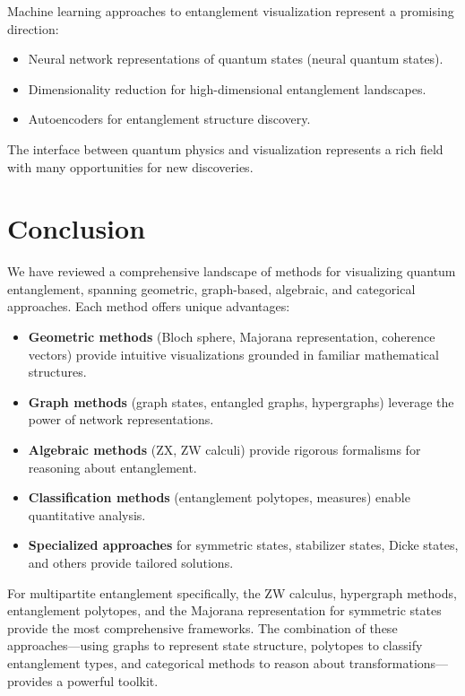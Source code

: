 \documentclass[12pt,a4paper]{article}
\begin{document}
Machine learning approaches to entanglement visualization represent a promising direction:
\begin{itemize}
	\item Neural network representations of quantum states (neural quantum states).
	\item Dimensionality reduction for high-dimensional entanglement landscapes.
	\item Autoencoders for entanglement structure discovery.
\end{itemize}

The interface between quantum physics and visualization represents a rich field with many opportunities for new discoveries.

\section{Conclusion}
\label{sec:conclusion}

We have reviewed a comprehensive landscape of methods for visualizing quantum entanglement, spanning geometric, graph-based, algebraic, and categorical approaches. Each method offers unique advantages:

\begin{itemize}
	\item \textbf{Geometric methods} (Bloch sphere, Majorana representation, coherence vectors) provide intuitive visualizations grounded in familiar mathematical structures.
	\item \textbf{Graph methods} (graph states, entangled graphs, hypergraphs) leverage the power of network representations.
	\item \textbf{Algebraic methods} (ZX, ZW calculi) provide rigorous formalisms for reasoning about entanglement.
	\item \textbf{Classification methods} (entanglement polytopes, measures) enable quantitative analysis.
	\item \textbf{Specialized approaches} for symmetric states, stabilizer states, Dicke states, and others provide tailored solutions.
\end{itemize}

For multipartite entanglement specifically, the ZW calculus, hypergraph methods, entanglement polytopes, and the Majorana representation for symmetric states provide the most comprehensive frameworks. The combination of these approaches---using graphs to represent state structure, polytopes to classify entanglement types, and categorical methods to reason about transformations---provides a powerful toolkit.
\end{document}
